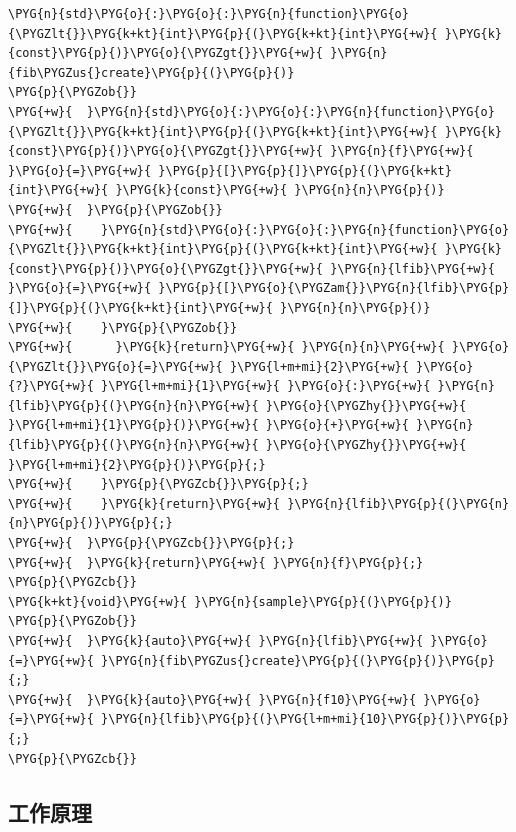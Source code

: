 \begin{itemize}
\begin{codeblockbg}
\begin{Verbatim}[commandchars=\\\{\},breaklines=true,breakanywhere=true,fontsize=\codefont,xleftmargin=17bp]
\PYG{n}{std}\PYG{o}{:}\PYG{o}{:}\PYG{n}{function}\PYG{o}{\PYGZlt{}}\PYG{k+kt}{int}\PYG{p}{(}\PYG{k+kt}{int}\PYG{+w}{ }\PYG{k}{const}\PYG{p}{)}\PYG{o}{\PYGZgt{}}\PYG{+w}{ }\PYG{n}{fib\PYGZus{}create}\PYG{p}{(}\PYG{p}{)}
\PYG{p}{\PYGZob{}}
\PYG{+w}{  }\PYG{n}{std}\PYG{o}{:}\PYG{o}{:}\PYG{n}{function}\PYG{o}{\PYGZlt{}}\PYG{k+kt}{int}\PYG{p}{(}\PYG{k+kt}{int}\PYG{+w}{ }\PYG{k}{const}\PYG{p}{)}\PYG{o}{\PYGZgt{}}\PYG{+w}{ }\PYG{n}{f}\PYG{+w}{ }\PYG{o}{=}\PYG{+w}{ }\PYG{p}{[}\PYG{p}{]}\PYG{p}{(}\PYG{k+kt}{int}\PYG{+w}{ }\PYG{k}{const}\PYG{+w}{ }\PYG{n}{n}\PYG{p}{)}
\PYG{+w}{  }\PYG{p}{\PYGZob{}}
\PYG{+w}{    }\PYG{n}{std}\PYG{o}{:}\PYG{o}{:}\PYG{n}{function}\PYG{o}{\PYGZlt{}}\PYG{k+kt}{int}\PYG{p}{(}\PYG{k+kt}{int}\PYG{+w}{ }\PYG{k}{const}\PYG{p}{)}\PYG{o}{\PYGZgt{}}\PYG{+w}{ }\PYG{n}{lfib}\PYG{+w}{ }\PYG{o}{=}\PYG{+w}{ }\PYG{p}{[}\PYG{o}{\PYGZam{}}\PYG{n}{lfib}\PYG{p}{]}\PYG{p}{(}\PYG{k+kt}{int}\PYG{+w}{ }\PYG{n}{n}\PYG{p}{)}
\PYG{+w}{    }\PYG{p}{\PYGZob{}}
\PYG{+w}{      }\PYG{k}{return}\PYG{+w}{ }\PYG{n}{n}\PYG{+w}{ }\PYG{o}{\PYGZlt{}}\PYG{o}{=}\PYG{+w}{ }\PYG{l+m+mi}{2}\PYG{+w}{ }\PYG{o}{?}\PYG{+w}{ }\PYG{l+m+mi}{1}\PYG{+w}{ }\PYG{o}{:}\PYG{+w}{ }\PYG{n}{lfib}\PYG{p}{(}\PYG{n}{n}\PYG{+w}{ }\PYG{o}{\PYGZhy{}}\PYG{+w}{ }\PYG{l+m+mi}{1}\PYG{p}{)}\PYG{+w}{ }\PYG{o}{+}\PYG{+w}{ }\PYG{n}{lfib}\PYG{p}{(}\PYG{n}{n}\PYG{+w}{ }\PYG{o}{\PYGZhy{}}\PYG{+w}{ }\PYG{l+m+mi}{2}\PYG{p}{)}\PYG{p}{;}
\PYG{+w}{    }\PYG{p}{\PYGZcb{}}\PYG{p}{;}
\PYG{+w}{    }\PYG{k}{return}\PYG{+w}{ }\PYG{n}{lfib}\PYG{p}{(}\PYG{n}{n}\PYG{p}{)}\PYG{p}{;}
\PYG{+w}{  }\PYG{p}{\PYGZcb{}}\PYG{p}{;}
\PYG{+w}{  }\PYG{k}{return}\PYG{+w}{ }\PYG{n}{f}\PYG{p}{;}
\PYG{p}{\PYGZcb{}}
\PYG{k+kt}{void}\PYG{+w}{ }\PYG{n}{sample}\PYG{p}{(}\PYG{p}{)}
\PYG{p}{\PYGZob{}}
\PYG{+w}{  }\PYG{k}{auto}\PYG{+w}{ }\PYG{n}{lfib}\PYG{+w}{ }\PYG{o}{=}\PYG{+w}{ }\PYG{n}{fib\PYGZus{}create}\PYG{p}{(}\PYG{p}{)}\PYG{p}{;}
\PYG{+w}{  }\PYG{k}{auto}\PYG{+w}{ }\PYG{n}{f10}\PYG{+w}{ }\PYG{o}{=}\PYG{+w}{ }\PYG{n}{lfib}\PYG{p}{(}\PYG{l+m+mi}{10}\PYG{p}{)}\PYG{p}{;}
\PYG{p}{\PYGZcb{}}
\end{Verbatim}
\end{codeblockbg}

\end{itemize}



\subsection{工作原理}



